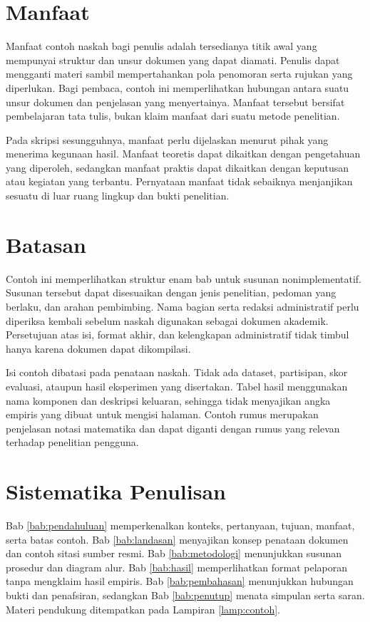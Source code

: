 \section{Manfaat}

Manfaat contoh naskah bagi penulis adalah tersedianya titik awal yang mempunyai struktur dan unsur dokumen yang dapat diamati. Penulis dapat mengganti materi sambil mempertahankan pola penomoran serta rujukan yang diperlukan. Bagi pembaca, contoh ini memperlihatkan hubungan antara suatu unsur dokumen dan penjelasan yang menyertainya. Manfaat tersebut bersifat pembelajaran tata tulis, bukan klaim manfaat dari suatu metode penelitian.

Pada skripsi sesungguhnya, manfaat perlu dijelaskan menurut pihak yang menerima kegunaan hasil. Manfaat teoretis dapat dikaitkan dengan pengetahuan yang diperoleh, sedangkan manfaat praktis dapat dikaitkan dengan keputusan atau kegiatan yang terbantu. Pernyataan manfaat tidak sebaiknya menjanjikan sesuatu di luar ruang lingkup dan bukti penelitian.

\section{Batasan}

Contoh ini memperlihatkan struktur enam bab untuk susunan nonimplementatif. Susunan tersebut dapat disesuaikan dengan jenis penelitian, pedoman yang berlaku, dan arahan pembimbing. Nama bagian serta redaksi administratif perlu diperiksa kembali sebelum naskah digunakan sebagai dokumen akademik. Persetujuan atas isi, format akhir, dan kelengkapan administratif tidak timbul hanya karena dokumen dapat dikompilasi.

Isi contoh dibatasi pada penataan naskah. Tidak ada dataset, partisipan, skor evaluasi, ataupun hasil eksperimen yang disertakan. Tabel hasil menggunakan nama komponen dan deskripsi keluaran, sehingga tidak menyajikan angka empiris yang dibuat untuk mengisi halaman. Contoh rumus merupakan penjelasan notasi matematika dan dapat diganti dengan rumus yang relevan terhadap penelitian pengguna.

\section{Sistematika Penulisan}

Bab \ref{bab:pendahuluan} memperkenalkan konteks, pertanyaan, tujuan, manfaat, serta batas contoh. Bab \ref{bab:landasan} menyajikan konsep penataan dokumen dan contoh sitasi sumber resmi. Bab \ref{bab:metodologi} menunjukkan susunan prosedur dan diagram alur. Bab \ref{bab:hasil} memperlihatkan format pelaporan tanpa mengklaim hasil empiris. Bab \ref{bab:pembahasan} menunjukkan hubungan bukti dan penafsiran, sedangkan Bab \ref{bab:penutup} menata simpulan serta saran. Materi pendukung ditempatkan pada Lampiran \ref{lamp:contoh}.
